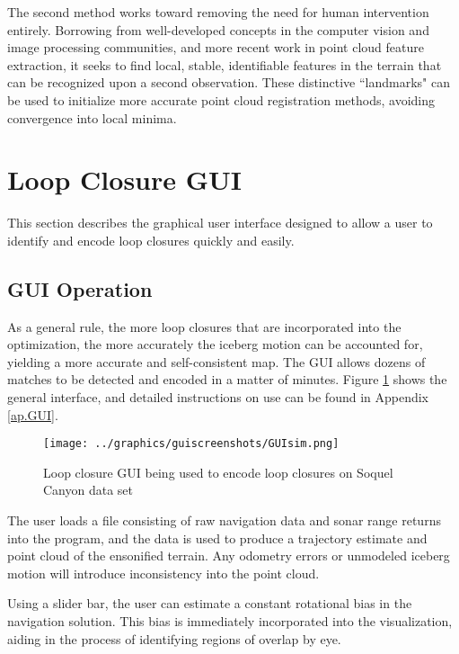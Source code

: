 The second method works toward removing the need for human intervention entirely. Borrowing from well-developed concepts in the computer vision and image processing communities, and more recent work in point cloud feature extraction, it seeks to find local, stable, identifiable features in the terrain that can be recognized upon a second observation. These distinctive ``landmarks" can be used to initialize more accurate point cloud registration methods, avoiding convergence into local minima. 


\section{Loop Closure GUI}
\label{sec:GUI}

This section describes the graphical user interface designed to allow a user to identify and encode loop closures quickly and easily. 

\subsection{GUI Operation}

As a general rule, the more loop closures that are incorporated into the optimization, the more accurately the iceberg motion can be accounted for, yielding a more accurate and self-consistent map. The GUI allows dozens of matches to be detected and encoded in a matter of minutes. Figure \ref{fig:GUI} shows the general interface, and detailed instructions on use can be found in Appendix \ref{ap.GUI}.

 \begin{figure}[ht]
   \centering
   \texttt{[image: ../graphics/guiscreenshots/GUIsim.png]} %
   \caption{Loop closure GUI being used to encode loop closures on Soquel Canyon data set }
   \label{fig:GUI}
\end{figure}

The user loads a file consisting of raw navigation data and sonar range returns into the program, and the data is used to produce a trajectory estimate and point cloud of the ensonified terrain. Any odometry errors or unmodeled iceberg motion will introduce inconsistency into the point cloud. 

Using a slider bar, the user can estimate a constant rotational bias in the navigation solution. This bias is immediately incorporated into the visualization, aiding in the process of identifying regions of overlap by eye. 

